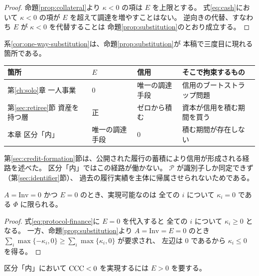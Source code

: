 \begin{proof}
命題\ref{prop:collateral}より $\kappa<0$ の項は $E$ を上限とする。
式\eqref{eq:cash}において $\kappa<0$ の項が $E$ を超えて調達を増やすことはない。
逆向きの代替、すなわち $E$ が $\kappa<0$ を代替することは
命題\ref{prop:substitution}のとおり成立する。
\end{proof}

系\ref{cor:one-way-substitution}は、命題\ref{prop:substitution}が
本稿で三度目に現れる箇所である。

\begin{center}
\begin{tabularx}{\textwidth}{@{}lllX@{}}
\toprule
箇所 & $E$ & 信用 & そこで拘束するもの \\
\midrule
第\ref{ch:solo}章 一人事業 & 0 & 唯一の調達手段 & 信用のブートストラップ問題 \\
第\ref{sec:retiree}節 資産を持つ層 & 正 & ゼロから積む & 資本が信用を積む期間を買う \\
本章 区分「内」 & 唯一の調達手段 & 0 & 積む期間が存在しない \\
\bottomrule
\end{tabularx}
\label{tab:substitution-three-points}
\end{center}

第\ref{sec:credit-formation}節は、公開された履行の蓄積により信用が形成される経路を述べた。
区分「内」ではこの経路が働かない。
$\mathcal{P}$ が識別子しか同定できず（第\ref{sec:identifier}節）、
過去の履行実績を主体に帰属させられないためである。

\begin{corollary}[資産を持たない主体の排除]
\label{cor:exclusion}
$A=\mathrm{Inv}=0$ かつ $E=0$ のとき、実現可能なのは
全ての $i$ について $\kappa_i=0$ である $\Phi$ に限られる。
\end{corollary}

\begin{proof}
式\eqref{eq:protocol-finance}に $E=0$ を代入すると
全ての $i$ について $\kappa_i\geq 0$ となる。
一方、命題\ref{prop:substitution}より $A=\mathrm{Inv}=E=0$ のとき
$\sum_i\max\{-\kappa_i,0\}\geq\sum_i\max\{\kappa_i,0\}$ が要求され、
左辺は $0$ であるから $\kappa_i\leq 0$ を得る。
\end{proof}

\begin{corollary}[前受による成長は資本を要する]
\label{cor:growth-needs-capital}
区分「内」において $\mathrm{CCC}<0$ を実現するには $E>0$ を要する。
\end{corollary}

